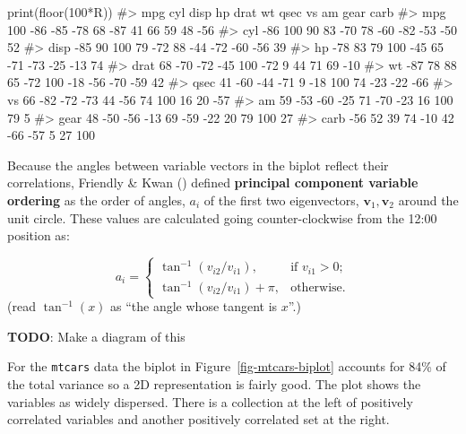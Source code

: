 \documentclass[
  letterpaper,
  10pt,
  krantz2]{krantz}
\makeatletter
\newenvironment{Shaded}{\begin{snugshade}}{\end{snugshade}}
\newcommand{\CommentTok}[1]{\textcolor[rgb]{0.37,0.37,0.37}{#1}}
\newcommand{\DecValTok}[1]{\textcolor[rgb]{0.68,0.00,0.00}{#1}}
\newcommand{\FunctionTok}[1]{\textcolor[rgb]{0.28,0.35,0.67}{#1}}
\newcommand{\NormalTok}[1]{\textcolor[rgb]{0.00,0.23,0.31}{#1}}
\newcommand{\SpecialCharTok}[1]{\textcolor[rgb]{0.37,0.37,0.37}{#1}}
\newenvironment{kframe}{%
  \medskip{}
  \setlength{\fboxsep}{.8em}
  \def\at@end@of@kframe{}%
  \ifinner\ifhmode%
  \def\at@end@of@kframe{\end{minipage}}%
  \begin{minipage}{\columnwidth}%
  \fi\fi%
  \def\FrameCommand##1{\hskip\@totalleftmargin \hskip-\fboxsep
  \colorbox{shadecolor}{##1}\hskip-\fboxsep
      \hskip-\linewidth \hskip-\@totalleftmargin \hskip\columnwidth}%
  \MakeFramed {\advance\hsize-\width
    \@totalleftmargin\z@ \linewidth\hsize
    \@setminipage}}%
{\par\unskip\endMakeFramed%
  \at@end@of@kframe}
\renewenvironment{Shaded}{\begin{kframe}}{\end{kframe}}
\makeatother
\begin{document}
\begin{Shaded}
\begin{Highlighting}[]
\FunctionTok{print}\NormalTok{(}\FunctionTok{floor}\NormalTok{(}\DecValTok{100}\SpecialCharTok{*}\NormalTok{R))}
\CommentTok{\#\textgreater{}      mpg cyl disp  hp drat  wt qsec  vs  am gear carb}
\CommentTok{\#\textgreater{} mpg  100 {-}86  {-}85 {-}78   68 {-}87   41  66  59   48  {-}56}
\CommentTok{\#\textgreater{} cyl  {-}86 100   90  83  {-}70  78  {-}60 {-}82 {-}53  {-}50   52}
\CommentTok{\#\textgreater{} disp {-}85  90  100  79  {-}72  88  {-}44 {-}72 {-}60  {-}56   39}
\CommentTok{\#\textgreater{} hp   {-}78  83   79 100  {-}45  65  {-}71 {-}73 {-}25  {-}13   74}
\CommentTok{\#\textgreater{} drat  68 {-}70  {-}72 {-}45  100 {-}72    9  44  71   69  {-}10}
\CommentTok{\#\textgreater{} wt   {-}87  78   88  65  {-}72 100  {-}18 {-}56 {-}70  {-}59   42}
\CommentTok{\#\textgreater{} qsec  41 {-}60  {-}44 {-}71    9 {-}18  100  74 {-}23  {-}22  {-}66}
\CommentTok{\#\textgreater{} vs    66 {-}82  {-}72 {-}73   44 {-}56   74 100  16   20  {-}57}
\CommentTok{\#\textgreater{} am    59 {-}53  {-}60 {-}25   71 {-}70  {-}23  16 100   79    5}
\CommentTok{\#\textgreater{} gear  48 {-}50  {-}56 {-}13   69 {-}59  {-}22  20  79  100   27}
\CommentTok{\#\textgreater{} carb {-}56  52   39  74  {-}10  42  {-}66 {-}57   5   27  100}
\end{Highlighting}
\end{Shaded}

Because the angles between variable vectors in the biplot reflect their
correlations, Friendly \& Kwan
() defined \textbf{principal
component variable ordering} as the order of angles, \(a_i\) of the
first two eigenvectors, \(\mathbf{v}_1, \mathbf{v}_2\) around the unit
circle. These values are calculated going counter-clockwise from the
12:00 position as:

\[
a_i = 
  \begin{cases}
    \tan^{-1} (v_{i2}/v_{i1}), & \text{if $v_{i1}>0$;}
     \\
    \tan^{-1} (v_{i2}/v_{i1}) + \pi, & \text{otherwise.}
  \end{cases}     
\] (read \(\tan^{-1}(x)\) as ``the angle whose tangent is \(x\)''.)

\textbf{TODO}: Make a diagram of this

For the \texttt{mtcars} data the biplot in
Figure~\ref{fig-mtcars-biplot} accounts for 84\% of the total variance
so a 2D representation is fairly good. The plot shows the variables as
widely dispersed. There is a collection at the left of positively
correlated variables and another positively correlated set at the right.
\end{document}

